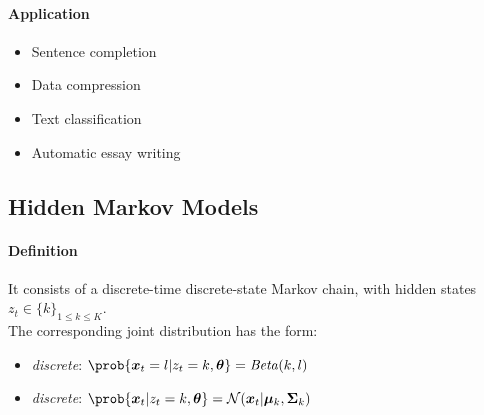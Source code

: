 \paragraph{Application}
\begin{itemize}
    \item Sentence completion
    \item Data compression
    \item Text classification
    \item Automatic essay writing
\end{itemize}


\subsection{Hidden Markov Models}
\paragraph{Definition}
It consists of a discrete-time discrete-state Markov chain, with hidden states $z_{t}\in\{k\}_{1\leq
k\leq K}$.\\
The corresponding joint distribution has the form:
\begin{center}
\end{center}


\begin{itemize}
    \item \emph{discrete}: $\prob{\bm{x}_{t}=l|z_{t}=k,\bm{\theta}} = \text{\emph{Beta}}(k,l)$
    \item \emph{discrete}: $\prob{\bm{x}_{t}|z_{t}=k,\bm{\theta}} = \mathcal{N}(\bm{x}_{t}|
        \bm{\mu}_{k},\bm{\Sigma}_{k})$
\end{itemize}

